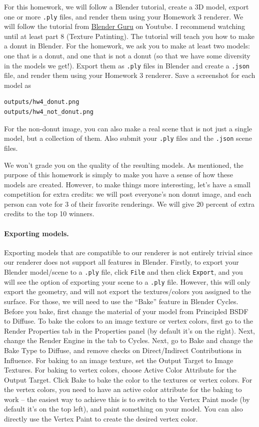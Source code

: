 For this homework, we will follow a Blender tutorial, create a 3D model, export one or more \lstinline{.ply} files, and render them using your Homework 3 renderer. We will follow the tutorial from \href{https://www.youtube.com/playlist?list=PLjEaoINr3zgFX8ZsChQVQsuDSjEqdWMAD}{Blender Guru} on Youtube. I recommend watching until at least part 8 (Texture Patinting). The tutorial will teach you how to make a donut in Blender. For the homework, we ask you to make at least two models: one that is a donut, and one that is not a donut (so that we have some diversity in the models we get!). Export them as \lstinline{.ply} files in Blender and create a \lstinline{.json} file, and render them using your Homework 3 renderer. Save a screenshot for each model as
\begin{lstlisting}[language=bash]
outputs/hw4_donut.png
outputs/hw4_not_donut.png
\end{lstlisting}
For the non-donut image, you can also make a real scene that is not just a single model, but a collection of them. Also submit your \lstinline{.ply} files and the \lstinline{.json} scene files.

We won't grade you on the quality of the resulting models. As mentioned, the purpose of this homework is simply to make you have a sense of how these models are created. However, to make things more interesting, let's have a small competition for extra credits: we will post everyone's non donut image, and each person can vote for 3 of their favorite renderings. We will give 20 percent of extra credits to the top 10 winners.

\paragraph{Exporting models.} Exporting models that are compatible to our renderer is not entirely trivial since our renderer does not support all features in Blender. Firstly, to export your Blender model/scene to a \lstinline{.ply} file, click \lstinline{File} and then click \lstinline{Export}, and you will see the option of exporting your scene to a \lstinline{.ply} file. However, this will only export the geometry, and will not export the textures/colors you assigned to the surface. For those, we will need to use the ``Bake'' feature in Blender Cycles. Before you bake, first change the material of your model from Principled BSDF to Diffuse. To bake the colors to an image texture or vertex colors, first go to the Render Properties tab in the Properties panel (by default it's on the right). Next, change the Render Engine in the tab to Cycles. Next, go to Bake and change the Bake Type to Diffuse, and remove checks on Direct/Indirect Contributions in Influence. For baking to an image texture, set the Output Target to Image Textures. For baking to vertex colors, choose Active Color Attribute for the Output Target. Click Bake to bake the color to the textures or vertex colors. For the vertex colors, you need to have an active color attribute for the baking to work -- the easiest way to achieve this is to switch to the Vertex Paint mode (by default it's on the top left), and paint something on your model. You can also directly use the Vertex Paint to create the desired vertex color.


